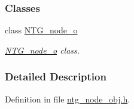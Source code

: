 \subsubsection*{Classes}
\begin{DoxyCompactItemize}
\item 
class \hyperlink{class_n_t_g__node__o}{NTG\_\-node\_\-o}
\begin{DoxyCompactList}\small\item\em \hyperlink{class_n_t_g__node__o}{NTG\_\-node\_\-o} class. \item\end{DoxyCompactList}\end{DoxyCompactItemize}


\subsubsection{Detailed Description}


Definition in file \hyperlink{ntg__node__obj_8h_source}{ntg\_\-node\_\-obj.h}.

